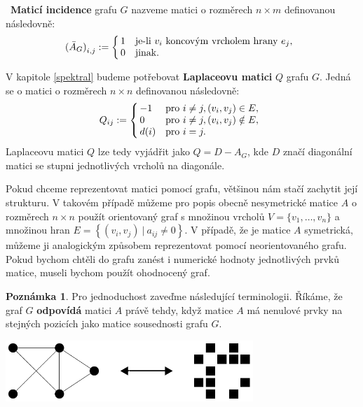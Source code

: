 \documentclass{ctuthesis}
\theoremstyle{plain}
\theoremstyle{definition}
\newtheorem{remark}{Poznámka}
\begin{document}
 \textbf{Maticí incidence} grafu $G$ nazveme matici o rozměrech $n \times m$  definovanou následovně:
\[
  {(\bar{A}_G)}_{i,j} :=
  \left\{
	  \begin{array}{@{\,}ll}
		  1  & \mbox{je-li $v_i$ koncovým vrcholem hrany $e_j$,} \\
		  0  & \mbox{jinak.}
	  \end{array}
  \right.
\]

V kapitole \ref{spektral} budeme potřebovat \textbf{Laplaceovu matici} $Q$ grafu $G$. Jedná se o matici o rozměrech $n \times n$ definovanou následovně:
\[
Q_{ij} :=
\left\{
	\begin{array}{@{\,}ll}
		-1  & \mbox{pro } i \neq j, (v_i,v_j) \in E, \\
		0 & \mbox{pro } i \neq j, (v_i,v_j) \notin E,\\
        d(i) & \mbox{pro } i = j.
	\end{array}
\right.
\]
Laplaceovu matici $Q$ lze tedy vyjádřit jako $Q = D - A_G$, kde $D$  značí diagonální matici se stupni jednotlivých vrcholů na diagonále.

\medskip

Pokud chceme reprezentovat matici pomocí grafu, většinou nám stačí zachytit její strukturu. V takovém případě můžeme pro popis obecně nesymetrické matice $A$ o rozměrech $n \times n$ použít orientovaný graf s množinou vrcholů $V = \{v_1,\ldots,v_n\}$ a množinou hran $E =\left\{(v_i,v_j) \ | \ a_{ij}\neq 0\right\}$. V případě, že je matice $A$ symetrická, můžeme ji analogickým způsobem reprezentovat pomocí neorientovaného grafu.
Pokud bychom chtěli do grafu zanést i numerické hodnoty jednotlivých prvků matice, museli bychom použít ohodnocený graf.

\begin{remark}
  Pro jednoduchost zaveďme následující terminologii. Říkáme, že graf $G$ \textbf{odpovídá} matici $A$ právě tehdy, když matice $A$ má nenulové prvky na stejných pozicích jako matice sousednosti grafu $G$.
\end{remark}

\bigskip
{
  \centering
  \includegraphics[width=0.7\textwidth]{pictures/matgr.pdf}
}
\bigskip
\end{document}
